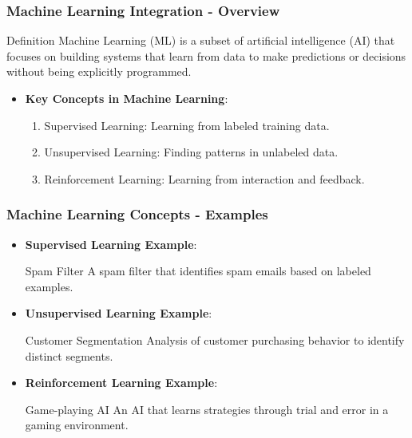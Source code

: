 \documentclass[aspectratio=169]{beamer}
\begin{document}
\begin{frame}[fragile]
    \frametitle{Machine Learning Integration - Overview}
    \begin{block}{Definition}
        Machine Learning (ML) is a subset of artificial intelligence (AI) that focuses on building systems that learn from data to make predictions or decisions without being explicitly programmed.
    \end{block}

    \begin{itemize}
        \item \textbf{Key Concepts in Machine Learning}:
        \begin{enumerate}
            \item Supervised Learning: Learning from labeled training data.
            \item Unsupervised Learning: Finding patterns in unlabeled data.
            \item Reinforcement Learning: Learning from interaction and feedback.
        \end{enumerate}
    \end{itemize}
\end{frame}

\begin{frame}[fragile]
    \frametitle{Machine Learning Concepts - Examples}
    \begin{itemize}
        \item \textbf{Supervised Learning Example}:
        \begin{block}{Spam Filter}
            A spam filter that identifies spam emails based on labeled examples.
        \end{block}

        \item \textbf{Unsupervised Learning Example}:
        \begin{block}{Customer Segmentation}
            Analysis of customer purchasing behavior to identify distinct segments.
        \end{block}

        \item \textbf{Reinforcement Learning Example}:
        \begin{block}{Game-playing AI}
            An AI that learns strategies through trial and error in a gaming environment.
        \end{block}
    \end{itemize}
\end{frame}
\end{document}
